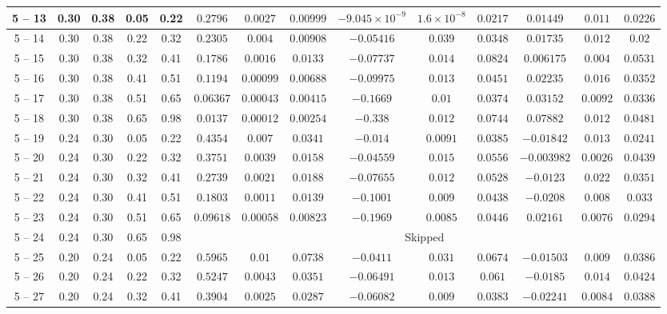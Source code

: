 \begin{longtable}{|*{14}{c|}}
\hline
5 -- 13 & 0.30 & 0.38 & 0.05 & 0.22 & $0.2796$ & $0.0027$ & $0.00999$ & $-9.045\times 10^{-9}$ & $1.6\times 10^{-8}$ & $0.0217$ & $0.01449$ & $0.011$ & $0.0226$ \\
\hline
5 -- 14 & 0.30 & 0.38 & 0.22 & 0.32 & $0.2305$ & $0.004$ & $0.00908$ & $-0.05416$ & $0.039$ & $0.0348$ & $0.01735$ & $0.012$ & $0.02$ \\
\hline
5 -- 15 & 0.30 & 0.38 & 0.32 & 0.41 & $0.1786$ & $0.0016$ & $0.0133$ & $-0.07737$ & $0.014$ & $0.0824$ & $0.006175$ & $0.004$ & $0.0531$ \\
\hline
5 -- 16 & 0.30 & 0.38 & 0.41 & 0.51 & $0.1194$ & $0.00099$ & $0.00688$ & $-0.09975$ & $0.013$ & $0.0451$ & $0.02235$ & $0.016$ & $0.0352$ \\
\hline
5 -- 17 & 0.30 & 0.38 & 0.51 & 0.65 & $0.06367$ & $0.00043$ & $0.00415$ & $-0.1669$ & $0.01$ & $0.0374$ & $0.03152$ & $0.0092$ & $0.0336$ \\
\hline
5 -- 18 & 0.30 & 0.38 & 0.65 & 0.98 & $0.0137$ & $0.00012$ & $0.00254$ & $-0.338$ & $0.012$ & $0.0744$ & $0.07882$ & $0.012$ & $0.0481$ \\
\hline
5 -- 19 & 0.24 & 0.30 & 0.05 & 0.22 & $0.4354$ & $0.007$ & $0.0341$ & $-0.014$ & $0.0091$ & $0.0385$ & $-0.01842$ & $0.013$ & $0.0241$ \\
\hline
5 -- 20 & 0.24 & 0.30 & 0.22 & 0.32 & $0.3751$ & $0.0039$ & $0.0158$ & $-0.04559$ & $0.015$ & $0.0556$ & $-0.003982$ & $0.0026$ & $0.0439$ \\
\hline
5 -- 21 & 0.24 & 0.30 & 0.32 & 0.41 & $0.2739$ & $0.0021$ & $0.0188$ & $-0.07655$ & $0.012$ & $0.0528$ & $-0.0123$ & $0.022$ & $0.0351$ \\
\hline
5 -- 22 & 0.24 & 0.30 & 0.41 & 0.51 & $0.1803$ & $0.0011$ & $0.0139$ & $-0.1001$ & $0.009$ & $0.0438$ & $-0.0208$ & $0.008$ & $0.033$ \\
\hline
5 -- 23 & 0.24 & 0.30 & 0.51 & 0.65 & $0.09618$ & $0.00058$ & $0.00823$ & $-0.1969$ & $0.0085$ & $0.0446$ & $0.02161$ & $0.0076$ & $0.0294$ \\
\hline
5 -- 24 & 0.24 & 0.30 & 0.65 & 0.98 & \multicolumn{9}{c|}{Skipped} \\
\hline
5 -- 25 & 0.20 & 0.24 & 0.05 & 0.22 & $0.5965$ & $0.01$ & $0.0738$ & $-0.0411$ & $0.031$ & $0.0674$ & $-0.01503$ & $0.009$ & $0.0386$ \\
\hline
5 -- 26 & 0.20 & 0.24 & 0.22 & 0.32 & $0.5247$ & $0.0043$ & $0.0351$ & $-0.06491$ & $0.013$ & $0.061$ & $-0.0185$ & $0.014$ & $0.0424$ \\
\hline
5 -- 27 & 0.20 & 0.24 & 0.32 & 0.41 & $0.3904$ & $0.0025$ & $0.0287$ & $-0.06082$ & $0.009$ & $0.0383$ & $-0.02241$ & $0.0084$ & $0.0388$ \\

\end{longtable}
